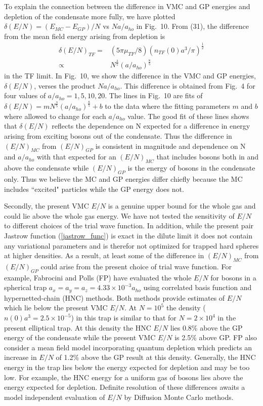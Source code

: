 \documentclass[aps,pra,twocolumn,groupedaddress]{revtex4}
\begin{document}
To explain the connection between the difference in VMC and GP energies and 
depletion of the condensate more fully, we have plotted 
$\delta (E/N) = (E_{MC}-E_{GP})/N$ vs $Na/a_{ho}$ in Fig.~10.  From (31), the
difference from the mean field energy arising from depletion
is 
\begin{equation}
\begin{array}{rl}
\delta (E/N)_{TF} = & (5\pi\mu_{TF}/8)(n_{TF}(0)a^3/\pi)^{\frac{1}{2} }\\ 
\propto & N^{\frac{3}{5} } (a/a_{ho})^{\frac{8}{5} }
\end{array}
\end{equation}
in the TF limit.
In Fig.~10, we show the difference in the VMC and GP energies, $\delta (E/N)$, verses
the product $Na/a_{ho}$.  This difference is obtained from Fig.~4 for four values of 
$a/a_{ho} = 1,5,10,20$.  The lines in Fig.~10 are fits of
$\delta(E/N) = m N^{\frac{3}{5} }(a/a_{ho})^{\frac{8}{5} } + b$ to the data where
the fitting parameters $m$ and $b$ where allowed to change for each $a/a_{ho}$ value.
The good fit of these lines shows that $\delta(E/N)$ reflects the dependence 
on N expected for a difference in energy arising from exciting bosons out of
the condensate.  Thus the difference in $(E/N)_{MC}$ from $(E/N)_{GP}$ is consistent
in magnitude and dependence on N and $a/a_{ho}$ with that expected for an
$(E/N)_{MC}$ that includes bosons both in and above the condensate while $(E/N)_{GP}$
is the energy of bosons in the condensate only.
Thus we believe the MC and GP energies differ chiefly
because the MC includes ``excited" particles while the GP energy does not. 

Secondly, the present VMC $E/N$ is a genuine upper bound for the whole gas 
and could lie above the whole gas energy.  We have not 
tested the sensitivity of $E/N$ to different choices of the trial wave function.
In addition, while the present pair Jastrow function (\ref{jastrow_func}) is exact in the dilute
limit it does not contain any variational parameters and is therefor not optimized
for trapped hard spheres at higher densities.  As a result, at least some of 
the difference in $(E/N)_{MC}$ from $(E/N)_{GP}$ could arise from the present
choice of trial wave function.
For example, Fabrocini and Polls (FP) have evaluated the whole $E/N$ for 
bosons in a spherical trap
$a_x=a_y=a_z=4.33\times10^{-3}a_{ho}$ using correlated basis function
and hypernetted-chain (HNC) methods\cite{fabrocini99}.  
Both methods provide estimates of $E/N$ which lie below the present VMC $E/N$.
At $N=10^5$ the density ($n(0)a^3=2.5\times10^{-5}$) in this trap is similar
to that for $N=2\times10^4$ in the present elliptical trap.  At this density
the HNC $E/N$ lies 0.8\% above the GP energy of the condensate while the present
VMC $E/N$ is 2.5\% above GP.
FP also consider a mean field model incorporating quantum depletion which predicts 
an increase in $E/N$ of 1.2\% above the GP result at this density.
Generally, the HNC energy in the trap lies below the energy
expected for depletion and may be too low.  For example, the HNC energy for a uniform
gas of bosons lies above the energy expected for depletion.  Definite resolution of
these differences awaits a model independent evaluation of $E/N$ by Diffusion
Monte Carlo methods.
\end{document}
